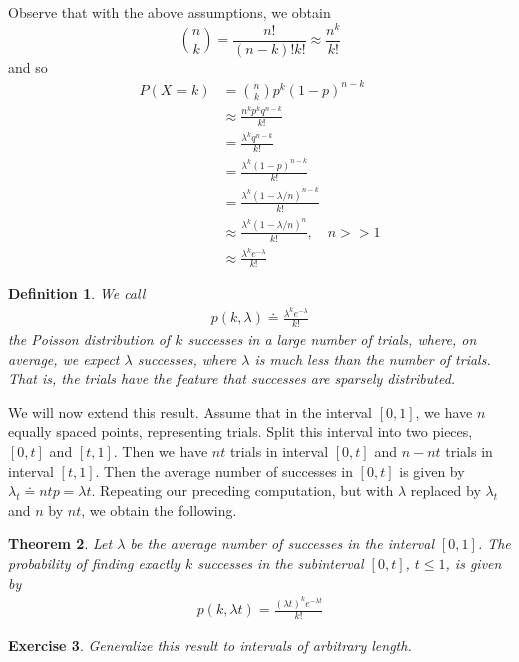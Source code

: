 \documentclass[12pt,reqno]{amsart}
\numberwithin{equation}{section}  %
\newtheorem{theorem}{Theorem}[section]
\newtheorem{definition}[theorem]{Definition}
\newtheorem {exercise}[theorem] {Exercise}
\begin{document}
Observe that with the above assumptions, we obtain
\begin{equation*}
\binom{n}{k} = \frac{n!}{(n-k)! k!} \approx \frac{n^k}{k!}
\end{equation*}
and so
\begin{align*}
P(X = k)
& = \binom{n}{k} p^k (1 - p)^{n-k} \\
& \approx \frac{n^k p^k q^{n-k}}{k!} \\
& = \frac{\lambda^k q^{n-k}}{k!} \\
& = \frac{\lambda^k (1-p)^{n-k}}{k!} \\
& = \frac{\lambda^k (1-\lambda/n)^{n-k}}{k!} \\
& \approx \frac{\lambda^k (1-\lambda/n)^{n}}{k!} , \quad n >> 1\\
& \approx \frac{\lambda^k e^{-\lambda}}{k!}
\end{align*}
\begin{definition}
We call
\begin{align*}
p(k, \lambda) \doteq \frac{\lambda^k e^{-\lambda}}{k!}
\end{align*}
the \emph{Poisson distribution} of $k$ successes in a large number
of trials, where, on average, we expect $\lambda$ successes, 
where $\lambda$ is much less than the number of trials. 
That is, the trials have the feature that successes are
sparsely distributed.
\end{definition}
We will now extend this result. Assume that in the interval $[0,1]$,
we have $n$ equally spaced points, representing trials. Split this interval into two pieces,
$[0,t]$ and $[t, 1]$. Then we have $nt$ trials in interval $[0,t]$ and
$n - nt$ trials in interval $[t,1]$. Then the average number of successes
in $[0,t]$ is given by $\lambda_t \doteq n t p = \lambda t$. Repeating
our preceding computation, but with $\lambda$ replaced by $\lambda_t$
and $n$ by $nt$, we obtain the following.
\begin{theorem}
Let $\lambda$ be the average number of successes in the interval $[0,1]$.
The probability of finding exactly $k$ successes  in the subinterval $[0,t]$,
$t \le 1$, is given by
\begin{align*}
p(k, \lambda t) = \frac{ (\lambda t)^{k} e^{-\lambda t}}{k!}
\end{align*}
\end{theorem}
\begin{exercise}
Generalize this result to intervals of arbitrary length.
\end{exercise}
\end{document}
